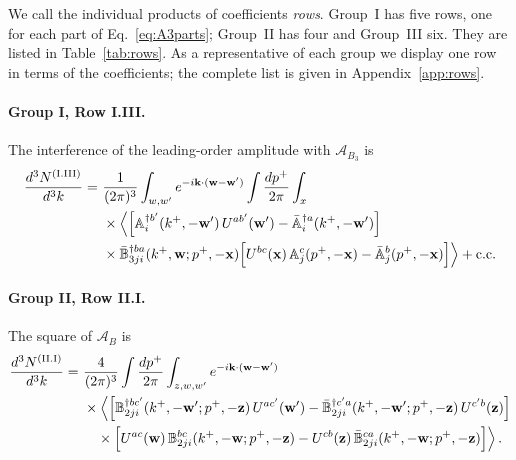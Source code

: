 We call the individual products of coefficients \emph{rows}. Group~I has five rows, one for each part of Eq.~\eqref{eq:A3parts}; Group~II has four and Group~III six. They are listed in Table~\ref{tab:rows}. As a representative of each group we display one row in terms of the coefficients; the complete list is given in Appendix~\ref{app:rows}.

\paragraph{Group I, Row I.III.} The interference of the leading-order amplitude with $\mathcal A_{B_3}$ is
\begin{align}\label{eq:rowI_III}
\frac{d^3N^{\rm(I.III)}}{d^3k}=\ &\frac{1}{(2\pi)^3}\int_{w,w'}e^{-i\v k\cdot(\v w-\v w')}\int\frac{dp^+}{2\pi}\int_x\notag\\&\times\Big\langle\Big[\mf A^{\dagger b'}_i(k^+,-\v w')\,U^{ab'}(\v w')-\bar{\mf A}^{\dagger a}_i(k^+,-\v w')\Big]\notag\\
&\times\bar{\mf B}^{\dagger ba}_{3ji}(k^+,\v w;p^+,-\v x)\Big[U^{bc}(\v x)\,\mf A^c_j(p^+,-\v x)-\bar{\mf A}^b_j(p^+,-\v x)\Big]\Big\rangle+{\rm c.c.}
\end{align}

\paragraph{Group II, Row II.I.} The square of $\mathcal A_B$ is
\begin{align}\label{eq:rowII_I}
\frac{d^3N^{\rm(II.I)}}{d^3k}=\ &\frac{4}{(2\pi)^3}\int\frac{dp^+}{2\pi}\int_{z,w,w'}e^{-i\v k\cdot(\v w-\v w')}\notag\\
&\times\Big\langle\Big[\mf B^{\dagger bc'}_{2ji}(k^+,-\v w';p^+,-\v z)\,U^{ac'}(\v w')-\bar{\mf B}^{\dagger c'a}_{2ji}(k^+,-\v w';p^+,-\v z)\,U^{c'b}(\v z)\Big]\notag\\
&\quad\times\Big[U^{ac}(\v w)\,\mf B^{bc}_{2ji}(k^+,-\v w;p^+,-\v z)-U^{cb}(\v z)\,\bar{\mf B}^{ca}_{2ji}(k^+,-\v w;p^+,-\v z)\Big]\Big\rangle\,.
\end{align}

